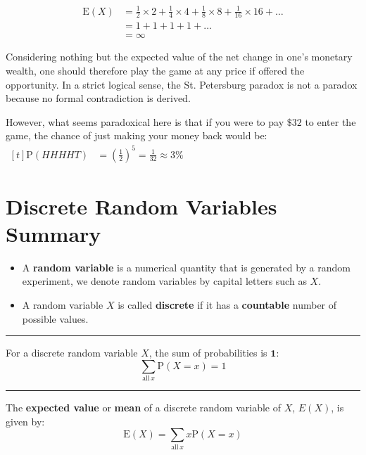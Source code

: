 \documentclass[11pt,a4paper]{book}
\begin{document}
\begin{align*}
\text{E}\left(X\right) & =\frac{1}{2}\times2+\frac{1}{4}\times4+\frac{1}{8}\times8+\frac{1}{16}\times16+\ldots\\
 & =1+1+1+1+\ldots\\
 & =\infty
\end{align*}

Considering nothing but the expected value of the net change in one's
monetary wealth, one should therefore play the game at any price if
offered the opportunity. In a strict logical sense, the St. Petersburg
paradox is not a paradox because no formal contradiction is derived.

However, what seems paradoxical here is that if you were to pay $\$32$ to enter the game, the chance of just making your money back would be: 
$
\begin{aligned}[t]
\text{P}\left(HHHHT\right) & =\left(\frac{1}{2}\right)^{5}=\frac{1}{32} \approx3\%
\end{aligned}
$

\newpage

\section{Discrete Random Variables Summary}

\bigskip

\begin{itemize}

\item A \textbf{random variable} is a numerical quantity that is generated
by a random experiment, we denote random variables by capital letters
such as $X$.

\item A random variable $X$ is called \textbf{discrete} if it has a \textbf{countable} number of possible values.


\end{itemize}

\vspace{5pt}
\hrule
\vspace{6pt}


For a discrete random variable $X$, the sum of probabilities is $\textbf{1}$:
\[
\sum_{\text{all}\,x}\text{P}\left(X=x\right)=1
\]

\vspace{5pt}
\hrule
\vspace{6pt}


The \textbf{expected value} or \textbf{mean} of a discrete random
variable of $X$, $E\left(X\right)$, is given by:
\[
\text{E}\left(X\right)=\sum_{\text{all}\,x}x\text{P}\left(X=x\right)
\]
\end{document}
